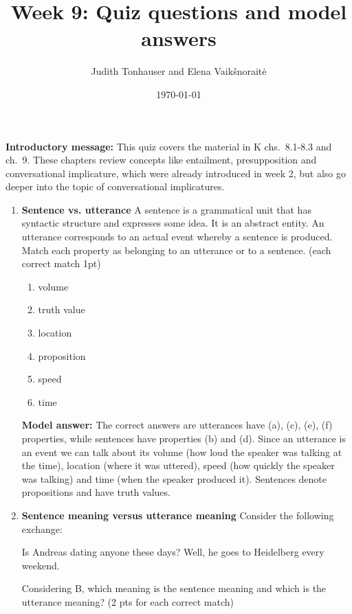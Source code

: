 \documentclass[a4,11pt]{article}
\title{Week 9: Quiz questions and model answers}
\author{Judith Tonhauser and Elena Vaik\v snorait\.{e} }
\date{\today}
\newcommand{\6}{\mbox{$[\hspace*{-.6mm}[$}}
\newcommand{\9}{\mbox{$]\hspace*{-.6mm}]$}}
\begin{document}
\maketitle

{\bf Introductory message:} This quiz covers the material in K chs.\ 8.1-8.3 and ch.\ 9. These chapters review concepts like entailment, presupposition and conversational implicature, which were already introduced in week 2, but also go deeper into the topic of conversational implicatures.

\begin{enumerate}[leftmargin = 12pt]

\item { \bf Sentence vs. utterance} A sentence is a grammatical unit that has syntactic structure and expresses some idea. It is an abstract entity. An utterance corresponds to an actual event whereby a sentence is produced. Match each property as belonging to an utterance or to a sentence. (each correct match 1pt)

\begin{enumerate}[noitemsep]
\item volume
\item truth value
\item location
\item proposition
\item speed
\item time
\end{enumerate}

{ \bf Model answer:} The correct answers are utterances have (a), (c), (e), (f) properties, while sentences have properties (b) and (d). Since an utterance is an event we can talk about its volume (how loud the speaker was talking at the time), location (where it was uttered), speed (how quickly the speaker was talking) and time (when the speaker produced it). Sentences denote propositions and have truth values.



\item {\bf Sentence meaning versus utterance meaning}  Consider the following exchange:

\begin{exe}
 Is Andreas dating anyone these days?
 Well, he goes to Heidelberg every weekend.
\end{exe}

Considering B, which meaning is the sentence meaning and which is the utterance meaning? (2 pts for each correct match)


\end{enumerate}
\end{document}
